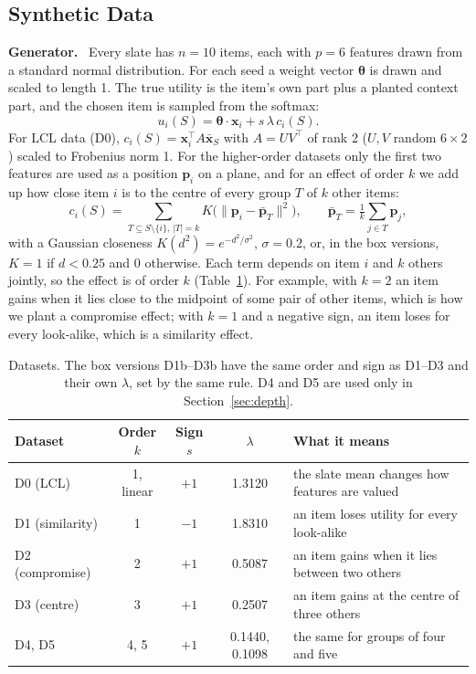 \documentclass[11pt,a4paper]{article}
\numberwithin{table}{section}
\numberwithin{figure}{section}
\numberwithin{equation}{section}
\newcommand{\para}[1]{\textbf{#1}\ }
\begin{document}
\subsection{Synthetic Data}\label{sec:data}
\para{Generator.} Every slate has $n=10$ items, each with $p=6$ features drawn from a standard normal distribution. For each seed a weight vector $\bm\theta$ is drawn and scaled to length 1. The true utility is the item's own part plus a planted context part, and the chosen item is sampled from the softmax:
\begin{equation}\label{eq:gen}
u_i(S)=\bm\theta\cdot\mathbf x_i+s\,\lambda\,c_i(S).
\end{equation}
For LCL data (D0), $c_i(S)=\mathbf x_i^{\top}A\bar{\mathbf x}_S$ with $A=UV^{\top}$ of rank 2 ($U,V$ random $6\times2$) scaled to Frobenius norm 1. For the higher-order datasets only the first two features are used as a position $\mathbf p_i$ on a plane, and for an effect of order $k$ we add up how close item $i$ is to the centre of every group $T$ of $k$ other items:
\begin{equation}\label{eq:korder}
c_i(S)=\sum_{T\subseteq S\setminus\{i\},\,|T|=k}K\big(\lVert\mathbf p_i-\bar{\mathbf p}_T\rVert^2\big),\qquad \bar{\mathbf p}_T=\tfrac1k\textstyle\sum_{j\in T}\mathbf p_j ,
\end{equation}
with a Gaussian closeness $K(d^2)=e^{-d^2/\sigma^2}$, $\sigma=0.2$, or, in the box versions, $K=1$ if $d<0.25$ and 0 otherwise. Each term depends on item $i$ and $k$ others jointly, so the effect is of order $k$ (Table~\ref{tab:data}). For example, with $k=2$ an item gains when it lies close to the midpoint of some pair of other items, which is how we plant a compromise effect; with $k=1$ and a negative sign, an item loses for every look-alike, which is a similarity effect.

\begin{table}[h]
\centering\small
\caption{Datasets. The box versions D1b--D3b have the same order and sign as D1--D3 and their own $\lambda$, set by the same rule. D4 and D5 are used only in Section~\ref{sec:depth}.}\label{tab:data}
\begin{tabular}{@{}lcccl@{}}
\toprule
Dataset & Order $k$ & Sign $s$ & $\lambda$ & What it means\\
\midrule
D0 (LCL) & 1, linear & $+1$ & 1.3120 & the slate mean changes how features are valued\\
D1 (similarity) & 1 & $-1$ & 1.8310 & an item loses utility for every look-alike\\
D2 (compromise) & 2 & $+1$ & 0.5087 & an item gains when it lies between two others\\
D3 (centre) & 3 & $+1$ & 0.2507 & an item gains at the centre of three others\\
D4, D5 & 4, 5 & $+1$ & 0.1440, 0.1098 & the same for groups of four and five\\
\bottomrule
\end{tabular}
\end{table}
\end{document}
